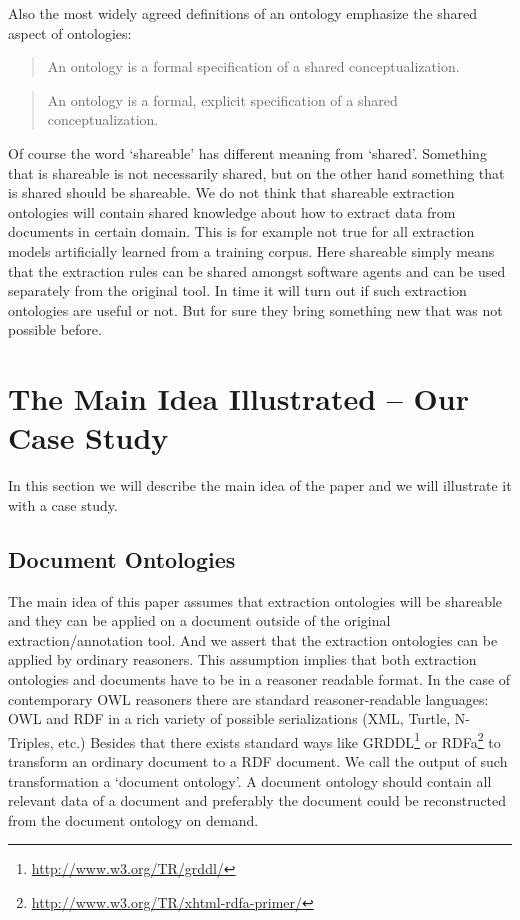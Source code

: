 \documentclass[10pt, conference, compsocconf]{IEEEtran}
\begin{document}
Also the most widely agreed definitions of an ontology emphasize the shared aspect of ontologies: 
\begin{quote}
An ontology is a formal specification of a shared conceptualization.	\cite{so17864}
\end{quote}

\begin{quote}
An ontology is a formal, explicit specification of a shared conceptualization. \cite{Studer1998161}
\end{quote}

Of course the word `shareable' has different meaning from `shared'. Something that is shareable is not necessarily shared, but on the other hand something that is shared should be shareable. We do not think that shareable extraction ontologies will contain shared knowledge about how to extract data from documents in certain domain. This is for example not true for all extraction models artificially learned from a training corpus. Here shareable simply means that the extraction rules can be shared amongst software agents and can be used separately from the original tool. In time it will turn out if such extraction ontologies are useful or not. But for sure they bring something new that was not possible before.






\section{The Main Idea Illustrated -- Our Case Study} \label{sec:case}

In this section we will describe the main idea of the paper and we will illustrate it with a case study.

\subsection{Document Ontologies} \label{sec:doc_ont}

The main idea of this paper assumes that extraction ontologies will be shareable and they can be applied on a document outside of the original extraction/annotation tool. And we assert that the extraction ontologies can be applied by ordinary reasoners. This assumption implies that both extraction ontologies and documents have to be in a reasoner readable format. In the case of contemporary OWL reasoners there are standard reasoner-readable languages: OWL and RDF in a rich variety of possible serializations (XML, Turtle, N-Triples, etc.) Besides that there exists standard ways like GRDDL\footnote{\url{http://www.w3.org/TR/grddl/}} or RDFa\footnote{\url{http://www.w3.org/TR/xhtml-rdfa-primer/}} to transform an ordinary document to a RDF document. We call the output of such transformation a `document ontology'. A document ontology should contain all relevant data of a document and preferably the document could be reconstructed from the document ontology on demand.
\end{document}
